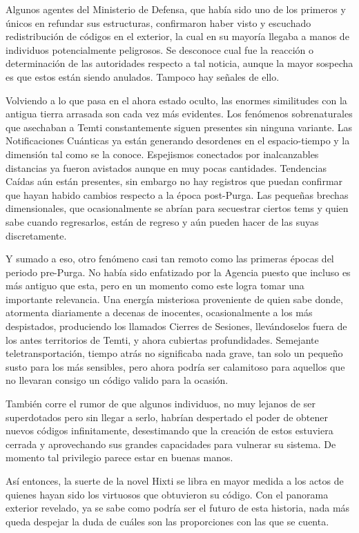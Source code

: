 \documentclass[
]{book}
\begin{document}
Algunos agentes del Ministerio de Defensa, que había sido uno de los primeros y únicos en refundar sus estructuras, confirmaron haber visto y escuchado redistribución de códigos en el exterior, la cual en su mayoría llegaba a manos de individuos potencialmente peligrosos. Se desconoce cual fue la reacción o determinación de las autoridades respecto a tal noticia, aunque la mayor sospecha es que estos están siendo anulados. Tampoco hay señales de ello.

Volviendo a lo que pasa en el ahora estado oculto, las enormes similitudes con la antigua tierra arrasada son cada vez más evidentes. Los fenómenos sobrenaturales que asechaban a Temti constantemente siguen presentes sin ninguna variante. Las Notificaciones Cuánticas ya están generando desordenes en el espacio-tiempo y la dimensión tal como se la conoce. Espejismos conectados por inalcanzables distancias ya fueron avistados aunque en muy pocas cantidades. Tendencias Caídas aún están presentes, sin embargo no hay registros que puedan confirmar que hayan habido cambios respecto a la época post-Purga. Las pequeñas brechas dimensionales, que ocasionalmente se abrían para secuestrar ciertos tems y quien sabe cuando regresarlos, están de regreso y aún pueden hacer de las suyas discretamente.

Y sumado a eso, otro fenómeno casi tan remoto como las primeras épocas del periodo pre-Purga. No había sido enfatizado por la Agencia puesto que incluso es más antiguo que esta, pero en un momento como este logra tomar una importante relevancia. Una energía misteriosa proveniente de quien sabe donde, atormenta diariamente a decenas de inocentes, ocasionalmente a los más despistados, produciendo los llamados Cierres de Sesiones, llevándoselos fuera de los antes territorios de Temti, y ahora cubiertas profundidades. Semejante teletransportación, tiempo atrás no significaba nada grave, tan solo un pequeño susto para los más sensibles, pero ahora podría ser calamitoso para aquellos que no llevaran consigo un código valido para la ocasión.

También corre el rumor de que algunos individuos, no muy lejanos de ser superdotados pero sin llegar a serlo, habrían despertado el poder de obtener nuevos códigos infinitamente, desestimando que la creación de estos estuviera cerrada y aprovechando sus grandes capacidades para vulnerar su sistema. De momento tal privilegio parece estar en buenas manos.

Así entonces, la suerte de la novel Hixti se libra en mayor medida a los actos de quienes hayan sido los virtuosos que obtuvieron su código. Con el panorama exterior revelado, ya se sabe como podría ser el futuro de esta historia, nada más queda despejar la duda de cuáles son las proporciones con las que se cuenta.
\end{document}
